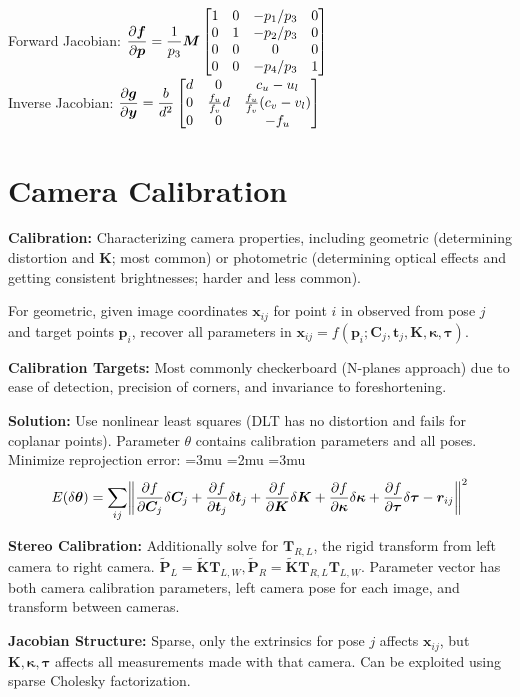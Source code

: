 \documentclass[twocolumn, 10pt]{extarticle}
\begin{document}
Forward Jacobian: \(\displaystyle \pdiff{\bm f}{\bm p} = \frac{1}{p_3}\bm M\matfour{1}{0}{-p_1/p_3}{0}{0}{1}{-p_2/p_3}{0}{0}{0}{0}{0}{0}{0}{-p_4/p_3}{1}\) \\
Inverse Jacobian: \(\displaystyle \pdiff{\bm g}{\bm y} = \frac{b}{d^2}\matthree{d}{0}{c_u - u_l}{0}{\frac{f_u}{f_v}d}{\frac{f_u}{f_v}(c_v - v_l)}{0}{0}{-f_u}\)

\section{Camera Calibration} %

\textbf{Calibration:} Characterizing camera properties, including geometric (determining distortion and \(\bm K\); most
common) or photometric (determining optical effects and getting consistent brightnesses; harder and less common).

For geometric, given image coordinates \(\bm x_{ij}\) for point \(i\) in observed from pose \(j\) and target points
\(\bm p_i\), recover all parameters in \(\bm x_{ij} = f(\bm p_i; \bm C_j, \bm t_j, \bm K, \bm\kappa, \bm\tau)\).

\textbf{Calibration Targets:} Most commonly checkerboard (N-planes approach) due to ease of detection, precision of
corners, and invariance to foreshortening.

\textbf{Solution:} Use nonlinear least squares (DLT has no distortion and fails for coplanar points). Parameter
\(\theta\) contains calibration parameters and all poses. Minimize reprojection error:
\begingroup
\thinmuskip=3mu       %
\medmuskip=2mu        %
\thickmuskip=3mu      %
\[E(\delta\bm\theta) = \sum _{ij}\norm*{\pdiff{f}{\bm C_j}\delta\bm C_j + \pdiff{f}{\bm t_j}\delta\bm t_j + \pdiff{f}{\bm K}\delta\bm K + \pdiff{f}{\bm\kappa}\delta\bm\kappa + \pdiff{f}{\bm\tau}\delta\bm\tau - \bm r_{ij}}^2\]
\endgroup

\textbf{Stereo Calibration:} Additionally solve for \(\bm T_{R,L}\), the rigid transform from left camera to right
camera. \(\tilde{\bm P}_L = \tilde{\bm K}\bm T_{L,W}, \tilde{\bm P}_R = \tilde{\bm K}\bm T_{R, L}\bm T_{L,W}\).
Parameter vector has both camera calibration parameters, left camera pose for each image, and transform between cameras.

\textbf{Jacobian Structure:} Sparse, only the extrinsics for pose \(j\) affects \(\bm x_{ij}\), but \(\bm K, \bm\kappa,
\bm\tau\) affects all measurements made with that camera. Can be exploited using sparse Cholesky factorization.
\end{document}
